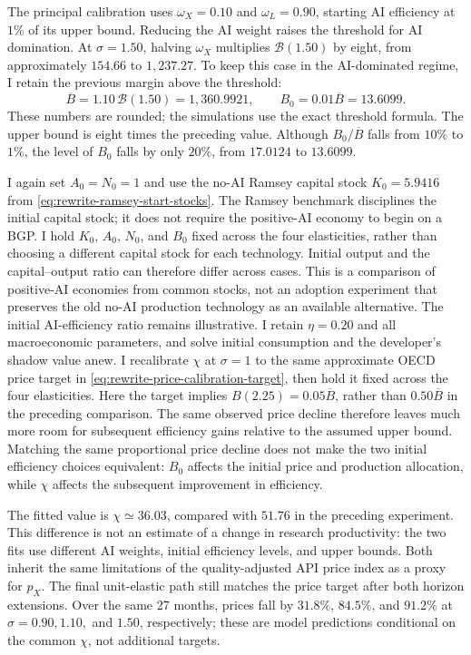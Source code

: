The principal calibration uses $\omega_X=0.10$ and
$\omega_L=0.90$, starting AI efficiency at $1\%$ of its upper bound.
Reducing the AI weight raises the threshold for AI domination. At
$\sigma=1.50$, halving $\omega_X$ multiplies $\mathcal B(1.50)$ by eight,
from approximately $154.66$ to $1{,}237.27$. To keep this case in the
AI-dominated regime, I retain the previous margin above the threshold:
\begin{equation}
 \overline B=1.10\,\mathcal B(1.50)=1{,}360.9921,\qquad
 B_0=0.01\overline B=13.6099.
 \label{eq:rewrite-low-ai-price-stocks}
\end{equation}
These numbers are rounded; the simulations use the exact threshold formula.
The upper bound is eight times the preceding value. Although $B_0/\overline B$
falls from $10\%$ to $1\%$, the level of $B_0$ falls by only $20\%$, from
$17.0124$ to $13.6099$.

I again set $A_0=N_0=1$ and use the no-AI Ramsey capital stock
$K_0=5.9416$ from \eqref{eq:rewrite-ramsey-start-stocks}.
The Ramsey benchmark disciplines the initial capital stock; it does not
require the positive-AI economy to begin on a BGP. I hold $K_0$, $A_0$, $N_0$,
and $B_0$ fixed across the four elasticities, rather than choosing a different
capital stock for each technology. Initial output and the capital--output
ratio can therefore differ across cases. This is a comparison of positive-AI
economies from common stocks, not an adoption experiment that preserves the
old no-AI production technology as an available alternative.
The initial AI-efficiency ratio remains illustrative. I retain $\eta=0.20$
and all macroeconomic parameters, and solve initial consumption and the
developer's shadow value anew. I recalibrate $\chi$ at $\sigma=1$ to the
same approximate OECD price target in \eqref{eq:rewrite-price-calibration-target},
then hold it fixed across the four elasticities. Here the target implies
$B(2.25)=0.05\overline B$, rather than $0.50\overline B$ in the preceding
comparison. The same observed price decline therefore leaves much more room
for subsequent efficiency gains relative to the assumed upper bound.
Matching the same proportional price decline does not make the two initial
efficiency choices equivalent: $B_0$ affects the initial price and production
allocation, while $\chi$ affects the subsequent improvement in efficiency.

The fitted value is $\chi\simeq36.03$, compared with $51.76$ in the
preceding experiment. This difference is not an estimate of a change in
research productivity: the two fits use different AI weights, initial
efficiency levels, and upper bounds. Both inherit the same limitations of
the quality-adjusted API price index as a proxy for $p_X$. The final
unit-elastic path still matches the price target after both horizon
extensions. Over the same 27 months, prices fall by $31.8\%$, $84.5\%$,
and $91.2\%$ at $\sigma=0.90,1.10,$ and $1.50$, respectively; these are
model predictions conditional on the common $\chi$, not additional targets.

